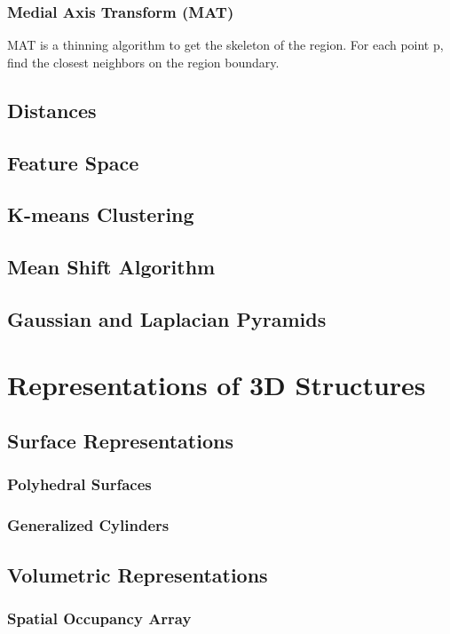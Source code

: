 \documentclass{article}
\begin{document}
\begin{multicols}{2}
 \subsubsection{Medial Axis Transform (MAT)}


  MAT is a thinning algorithm to get the skeleton of the region.
  For each point p, find the closest neighbors on the region boundary.


\subsection{Distances}
\subsection{Feature Space}
\subsection{K-means Clustering}
\subsection{Mean Shift Algorithm}
\subsection{Gaussian and Laplacian Pyramids}

\section{Representations of 3D Structures}
\subsection{Surface Representations}
\subsubsection{Polyhedral Surfaces}
\subsubsection{Generalized Cylinders}
\subsection{Volumetric Representations}
\subsubsection{Spatial Occupancy Array}

\end{multicols}
\end{document}
